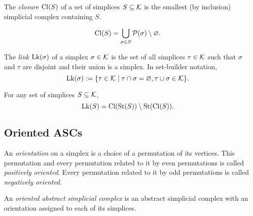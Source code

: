\begin{definition}\label{def:closure}
    \leanok
    The \emph{closure} $\operatorname{Cl}(S)$ of a set of simplices $S \subseteq \mathcal{K}$ is the smallest (by inclusion) simplicial complex containing $S$.
\end{definition}

\begin{lemma}\label{lem:closure_eq_down_closure}
    \[ \operatorname{Cl}(S) = \bigcup_{\sigma \in S} \mathcal{P}(\sigma) \setminus \varnothing. \] %
\end{lemma}

\begin{definition}\label{def:link}
    The \emph{link} $\operatorname{Lk}(\sigma)$ of a simplex $\sigma \in \mathcal{K}$ is the set of all simplices $\tau \in \mathcal{K}$ such that $\sigma$ and $\tau$ are disjoint and their union is a simplex. In set-builder notation,
    \[ \operatorname{Lk}(\sigma) := \{ \tau \in \mathcal{K} \mid \tau \cap \sigma = \varnothing, \tau \cup \sigma \in \mathcal{K} \}. \]
\end{definition}

\begin{lemma}\label{lem:lk_eq_cl_st_sub_st_cl}
    For any set of simplices $S \subseteq \mathcal{K}$, 
    \[ \operatorname{Lk}(S) = \operatorname{Cl}(\operatorname{St}(S)) \setminus \operatorname{St}(\operatorname{Cl}(S)). \]
\end{lemma}

\subsection{Oriented ASCs}
\label{ssec:oriented_ASCs}



\begin{definition}\label{def:oriented_asc}
    An \emph{orientation} on a simplex is a choice of a permutation of its vertices. This permutation and every permutation related to it by even permutations is called \emph{positively oriented}. Every permutation related to it by odd permutations is called \emph{negatively oriented}.
    
    An \emph{oriented abstract simplicial complex} is an abstract simplicial complex with an orientation assigned to each of its simplices.
\end{definition}


